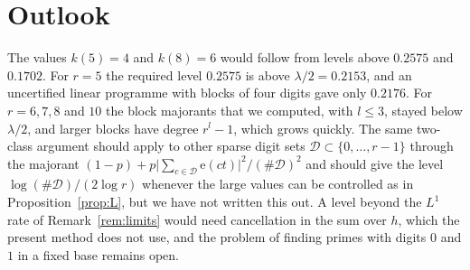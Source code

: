\documentclass[11pt]{amsart}
\theoremstyle{definition}
\numberwithin{equation}{section}
\newcommand{\e}{\mathrm{e}}
\begin{document}
\section{Outlook}\label{sec:outlook}

The values $k(5)=4$ and $k(8)=6$ would follow from levels above $0.2575$ and $0.1702$. For $r=5$ the required level $0.2575$ is above $\lambda/2=0.2153$, and an uncertified linear programme with blocks of four digits gave only $0.2176$. For $r=6,7,8$ and $10$ the block majorants that we computed, with $l\le3$, stayed below $\lambda/2$, and larger blocks have degree $r^l-1$, which grows quickly. The same two-class argument should apply to other sparse digit sets $\mathcal D\subset\{0,\dots,r-1\}$ through the majorant $(1-p)+p\lvert\sum_{c\in\mathcal D}\e(ct)\rvert^2/(\#\mathcal D)^2$ and should give the level $\log(\#\mathcal D)/(2\log r)$ whenever the large values can be controlled as in Proposition~\ref{prop:L}, but we have not written this out. A level beyond the $L^1$ rate of Remark~\ref{rem:limits} would need cancellation in the sum over $h$, which the present method does not use, and the problem of finding primes with digits $0$ and $1$ in a fixed base remains open.
\end{document}
